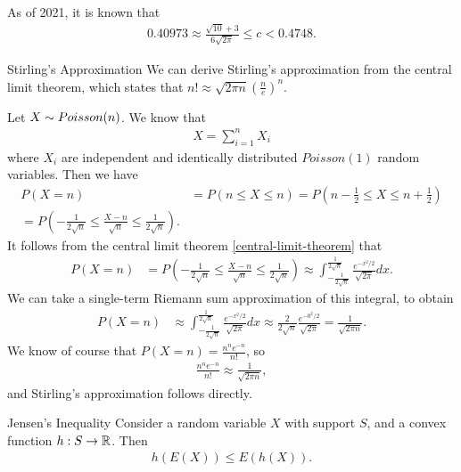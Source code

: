\begin{rmk}
    As of 2021, it is known that
    \begin{align*}
        0.40973 \approx \frac{\sqrt{10}+3}{6\sqrt{2\pi}} \leq c < 0.4748.
    \end{align*}
\end{rmk}

\begin{exmp}{Stirling's Approximation}\proofbreak
    We can derive Stirling's approximation from the central limit theorem, which states that $n! \approx \sqrt{2\pi n}\left(\frac{n}{e}\right)^n$.

    Let $X \sim Poisson(n)$. We know that
    \begin{align*}
        X = \sum_{i=1}^{n}X_i
    \end{align*}
    where $X_i$ are independent and identically distributed $Poisson(1)$ random variables. Then we have
    \begin{align*}
        P(X = n) &= P(n \leq X \leq n) = P\left(n-\frac{1}{2} \leq X \leq n + \frac{1}{2}\right) \\
        = P\left(-\frac{1}{2\sqrt{n}} \leq \frac{X-n}{\sqrt{n}} \leq \frac{1}{2\sqrt{n}}\right).
    \end{align*}
    It follows from the central limit theorem \ref{central-limit-theorem} that
    \begin{align*}
        P(X = n) &= P\left(-\frac{1}{2\sqrt{n}} \leq \frac{X-n}{\sqrt{n}} \leq \frac{1}{2\sqrt{n}}\right) \approx \int_{-\frac{1}{2\sqrt{n}}}^{\frac{1}{2\sqrt{n}}}\frac{e^{-x^2/2}}{\sqrt{2\pi}}dx.
    \end{align*}
    We can take a single-term Riemann sum approximation of this integral, to obtain
    \begin{align*}
        P(X = n) &\approx \int_{-\frac{1}{2\sqrt{n}}}^{\frac{1}{2\sqrt{n}}}\frac{e^{-x^2/2}}{\sqrt{2\pi}}dx \approx \frac{2}{2\sqrt{n}}\frac{e^{-0^2/2}}{\sqrt{2\pi}} = \frac{1}{\sqrt{2\pi n}}.
    \end{align*}
    We know of course that $P(X = n) = \frac{{n^n}e^{-n}}{n!}$, so
    \begin{align*}
        \frac{{n^n}e^{-n}}{n!} \approx \frac{1}{\sqrt{2\pi n}},
    \end{align*}
    and Stirling's approximation follows directly.
\end{exmp}

\begin{prop}{Jensen's Inequality}\label{jensen-inequality}\proofbreak
    Consider a random variable $X$ with support $S$, and a convex function $h: S \to \mathbb{R}$. Then
    \begin{align*}
        h\left(E(X)\right) \leq E\left(h(X)\right).
    \end{align*}
\end{prop}

